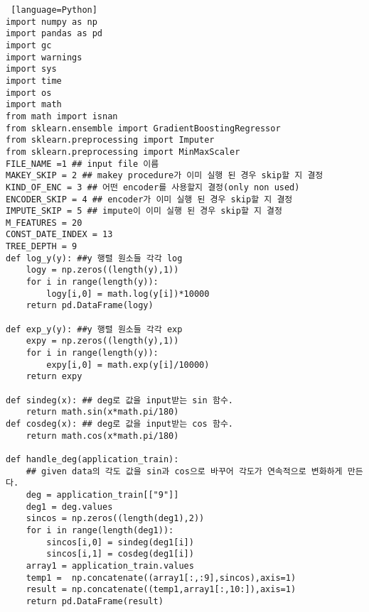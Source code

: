 \documentclass{article}
\begin{document}
\begin{lstlisting} [language=Python]
import numpy as np
import pandas as pd
import gc
import warnings
import sys
import time
import os
import math
from math import isnan
from sklearn.ensemble import GradientBoostingRegressor
from sklearn.preprocessing import Imputer
from sklearn.preprocessing import MinMaxScaler
FILE_NAME =1 ## input file 이름
MAKEY_SKIP = 2 ## makey procedure가 이미 실행 된 경우 skip할 지 결정
KIND_OF_ENC = 3 ## 어떤 encoder를 사용할지 결정(only non used)
ENCODER_SKIP = 4 ## encoder가 이미 실행 된 경우 skip할 지 결정
IMPUTE_SKIP = 5 ## impute이 이미 실행 된 경우 skip할 지 결정
M_FEATURES = 20
CONST_DATE_INDEX = 13
TREE_DEPTH = 9
def log_y(y): ##y 행렬 원소들 각각 log
    logy = np.zeros((length(y),1))
    for i in range(length(y)):
        logy[i,0] = math.log(y[i])*10000
    return pd.DataFrame(logy)

def exp_y(y): ##y 행렬 원소들 각각 exp 
    expy = np.zeros((length(y),1))
    for i in range(length(y)):
        expy[i,0] = math.exp(y[i]/10000)
    return expy

def sindeg(x): ## deg로 값을 input받는 sin 함수.
    return math.sin(x*math.pi/180)
def cosdeg(x): ## deg로 값을 input받는 cos 함수.
    return math.cos(x*math.pi/180)

def handle_deg(application_train):
    ## given data의 각도 값을 sin과 cos으로 바꾸어 각도가 연속적으로 변화하게 만든다.
    deg = application_train[["9"]]
    deg1 = deg.values
    sincos = np.zeros((length(deg1),2))
    for i in range(length(deg1)):
        sincos[i,0] = sindeg(deg1[i])
        sincos[i,1] = cosdeg(deg1[i])
    array1 = application_train.values
    temp1 =  np.concatenate((array1[:,:9],sincos),axis=1)
    result = np.concatenate((temp1,array1[:,10:]),axis=1)
    return pd.DataFrame(result)


\end{lstlisting}
\end{document}

